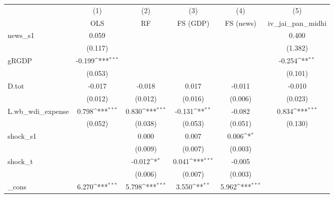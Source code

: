 {
\def\sym#1{\ifmmode^{#1}\else\(^{#1}\)\fi}
\begin{tabular}{l*{5}{c}}
\toprule
            &\multicolumn{1}{c}{(1)}&\multicolumn{1}{c}{(2)}&\multicolumn{1}{c}{(3)}&\multicolumn{1}{c}{(4)}&\multicolumn{1}{c}{(5)}\\
            &\multicolumn{1}{c}{OLS}&\multicolumn{1}{c}{RF}&\multicolumn{1}{c}{FS (GDP)}&\multicolumn{1}{c}{FS (news)}&\multicolumn{1}{c}{iv\_jai\_pan\_midhi}\\
\midrule
news\_s1     &       0.059         &                     &                     &                     &       0.400         \\
            &     (0.117)         &                     &                     &                     &     (1.382)         \\
\addlinespace
gRGDP       &      -0.199\sym{***}&                     &                     &                     &      -0.254\sym{**} \\
            &     (0.053)         &                     &                     &                     &     (0.101)         \\
\addlinespace
D.tot       &      -0.017         &      -0.018         &       0.017         &      -0.011         &      -0.010         \\
            &     (0.012)         &     (0.012)         &     (0.016)         &     (0.006)         &     (0.023)         \\
\addlinespace
L.wb\_wdi\_expense&       0.798\sym{***}&       0.830\sym{***}&      -0.131\sym{**} &      -0.082         &       0.834\sym{***}\\
            &     (0.052)         &     (0.038)         &     (0.053)         &     (0.051)         &     (0.130)         \\
\addlinespace
shock\_s1    &                     &       0.000         &       0.007         &       0.006\sym{*}  &                     \\
            &                     &     (0.009)         &     (0.007)         &     (0.003)         &                     \\
\addlinespace
shock\_t     &                     &      -0.012\sym{*}  &       0.041\sym{***}&      -0.005         &                     \\
            &                     &     (0.006)         &     (0.007)         &     (0.003)         &                     \\
\addlinespace
\_cons      &       6.270\sym{***}&       5.798\sym{***}&       3.550\sym{**} &       5.962\sym{***}&                     \\

\end{tabular}}
